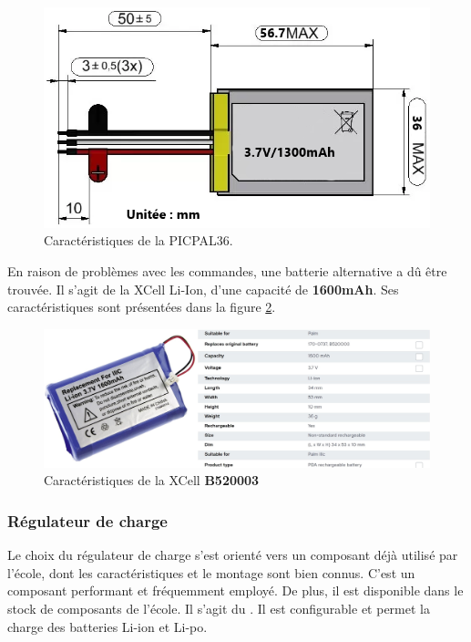 \clearpage

\begin{figure}[!h]
	\centering
	\includegraphics[width=.8\linewidth]{../figures/pre_etude/batt}
	\caption{Caractéristiques de la PICPAL36.}
	\label{fig:batt}
\end{figure}

En raison de problèmes avec les commandes, une batterie alternative a dû être trouvée. Il s'agit de la XCell  Li-Ion, d'une capacité de \textbf{1600mAh}. Ses caractéristiques sont présentées dans la figure \ref{fig:batt2}.

\begin{figure}[h]
	\centering
	\includegraphics[width=.8\linewidth]{../figures/pre_etude/batt2}
	\caption{Caractéristiques de la XCell \textbf{B520003}}
	\label{fig:batt2}
\end{figure}



\subsubsection{Régulateur de charge} Le choix du régulateur de charge s'est orienté vers un composant déjà utilisé par l'école, dont les caractéristiques et le montage sont bien connus. C'est un composant performant et fréquemment employé. De plus, il est disponible dans le stock de composants de l'école. Il s'agit du . Il est configurable et permet la charge des batteries Li-ion et Li-po.

